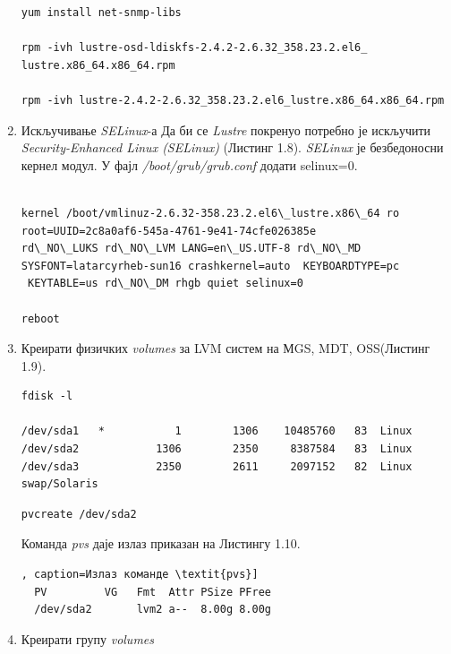 \begin{enumerate}
\begin{lstlisting}[style=nonumbers,frame=single,caption= Инсталација Net-SNMP-а]
yum install net-snmp-libs

rpm -ivh lustre-osd-ldiskfs-2.4.2-2.6.32_358.23.2.el6_
lustre.x86_64.x86_64.rpm

rpm -ivh lustre-2.4.2-2.6.32_358.23.2.el6_lustre.x86_64.x86_64.rpm
\end{lstlisting}


\item Искључивање \textit{SELinux}-а 
Да би се   \textit{Lustre} покренуо потребно је искључити \textit{Security-Enhanced Linux (SELinux)} (Листинг 1.8). \textit{SELinux} је безбедоносни кернел модул.
У фајл \textit{/boot/grub/grub.conf} додати selinux=0.

\begin{lstlisting}[style=nonumbers,frame=single,caption= Команде за искључивање \textit{SELinux}-а]

kernel /boot/vmlinuz-2.6.32-358.23.2.el6\_lustre.x86\_64 ro root=UUID=2c8a0af6-545a-4761-9e41-74cfe026385e 
rd\_NO\_LUKS rd\_NO\_LVM LANG=en\_US.UTF-8 rd\_NO\_MD SYSFONT=latarcyrheb-sun16 crashkernel=auto  KEYBOARDTYPE=pc
 KEYTABLE=us rd\_NO\_DM rhgb quiet selinux=0

reboot 
\end{lstlisting}

\item Креирати физичких \textit{volumes} за LVM систем на МGS, MDT, OSS(Листинг 1.9).
\begin{lstlisting}[style=nonumbers,frame=single, caption=Излаз команде \textit{fdisk -l}]
fdisk -l

/dev/sda1   *           1        1306    10485760   83  Linux
/dev/sda2            1306        2350     8387584   83  Linux
/dev/sda3            2350        2611     2097152   82  Linux swap/Solaris
\end{lstlisting}

\begin{verbatim}
pvcreate /dev/sda2
\end{verbatim}

Команда \textit{pvs} даје излаз приказан на Листингу 1.10.

\begin{lstlisting}[style=nonumbers,frame=single], caption=Излаз команде \textit{pvs}]
  PV         VG   Fmt  Attr PSize PFree
  /dev/sda2       lvm2 a--  8.00g 8.00g
\end{lstlisting}

\item Креирати групу \textit{volumes}


\end{enumerate}
